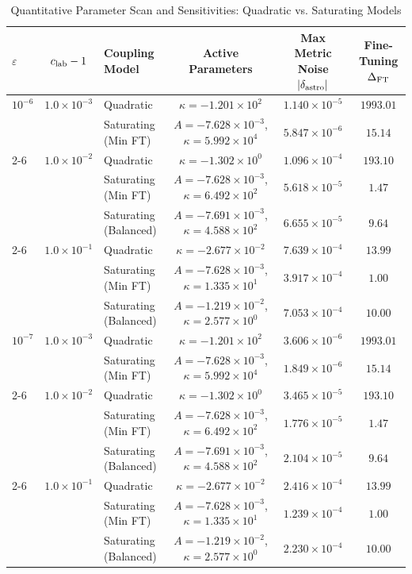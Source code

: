 \documentclass[11pt,a4paper]{article}
\theoremstyle{definition}
\begin{document}
	\begin{table}[h!]
		\centering
		\caption{Quantitative Parameter Scan and Sensitivities: Quadratic vs. Saturating Models}
		\label{tab:coupling_comparison}
		\small
		\begin{tabular}{l|c|l|c|c|c}
			\hline
			$\varepsilon$ & $c_{\rm lab} - 1$ & \textbf{Coupling Model} & \textbf{Active Parameters} & \textbf{Max Metric Noise } $|\delta_{\rm astro}|$ & \textbf{Fine-Tuning } $\Delta_{\rm FT}$ \\
			\hline
			$10^{-6}$ & $1.0\times10^{-3}$ & Quadratic & $\kappa = -1.201 \times 10^{2}$ & $1.140 \times 10^{-5}$ & $1993.01$ \\
			& & Saturating (Min FT) & $A=-7.628 \times 10^{-3}$, $\kappa=5.992 \times 10^{4}$ & $5.847 \times 10^{-6}$ & $15.14$ \\
			\cline{2-6}
			& $1.0\times10^{-2}$ & Quadratic & $\kappa = -1.302 \times 10^{0}$ & $1.096 \times 10^{-4}$ & $193.10$ \\
			& & Saturating (Min FT) & $A=-7.628 \times 10^{-3}$, $\kappa=6.492 \times 10^{2}$ & $5.618 \times 10^{-5}$ & $1.47$ \\
			& & Saturating (Balanced) & $A=-7.691 \times 10^{-3}$, $\kappa=4.588 \times 10^{2}$ & $6.655 \times 10^{-5}$ & $9.64$ \\
			\cline{2-6}
			& $1.0\times10^{-1}$ & Quadratic & $\kappa = -2.677 \times 10^{-2}$ & $7.639 \times 10^{-4}$ & $13.99$ \\
			& & Saturating (Min FT) & $A=-7.628 \times 10^{-3}$, $\kappa=1.335 \times 10^{1}$ & $3.917 \times 10^{-4}$ & $1.00$ \\
			& & Saturating (Balanced) & $A=-1.219 \times 10^{-2}$, $\kappa=2.577 \times 10^{0}$ & $7.053 \times 10^{-4}$ & $10.00$ \\
			\hline
			$10^{-7}$ & $1.0\times10^{-3}$ & Quadratic & $\kappa = -1.201 \times 10^{2}$ & $3.606 \times 10^{-6}$ & $1993.01$ \\
			& & Saturating (Min FT) & $A=-7.628 \times 10^{-3}$, $\kappa=5.992 \times 10^{4}$ & $1.849 \times 10^{-6}$ & $15.14$ \\
			\cline{2-6}
			& $1.0\times10^{-2}$ & Quadratic & $\kappa = -1.302 \times 10^{0}$ & $3.465 \times 10^{-5}$ & $193.10$ \\
			& & Saturating (Min FT) & $A=-7.628 \times 10^{-3}$, $\kappa=6.492 \times 10^{2}$ & $1.776 \times 10^{-5}$ & $1.47$ \\
			& & Saturating (Balanced) & $A=-7.691 \times 10^{-3}$, $\kappa=4.588 \times 10^{2}$ & $2.104 \times 10^{-5}$ & $9.64$ \\
			\cline{2-6}
			& $1.0\times10^{-1}$ & Quadratic & $\kappa = -2.677 \times 10^{-2}$ & $2.416 \times 10^{-4}$ & $13.99$ \\
			& & Saturating (Min FT) & $A=-7.628 \times 10^{-3}$, $\kappa=1.335 \times 10^{1}$ & $1.239 \times 10^{-4}$ & $1.00$ \\
			& & Saturating (Balanced) & $A=-1.219 \times 10^{-2}$, $\kappa=2.577 \times 10^{0}$ & $2.230 \times 10^{-4}$ & $10.00$ \\
			\hline
		\end{tabular}
	\end{table}
	
\end{document}
